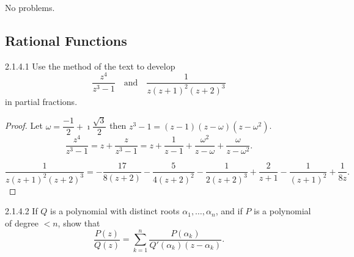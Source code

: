 No problems.

\subsection{Rational Functions}

\begin{problem}{2.1.4.1}
Use the method of the text to develop
\[
	\frac{z^{4}}{z^{3} - 1} \quad \text{and} \quad \frac{1}{z{(z+1)}^{2}{(z+2)}^{3}}
\]
in partial fractions.
\end{problem}

\begin{proof}
	Let \( \omega = \dfrac{-1}{2} + \imath\dfrac{\sqrt{3}}{2} \) then \( z^{3} - 1 = (z - 1)(z - \omega)(z - \omega^{2}) \).
	\[
		\frac{z^{4}}{z^{3} - 1} = z + \dfrac{z}{z^{3} - 1} = z + \dfrac{1}{z - 1} + \dfrac{\omega^{2}}{z - \omega} + \dfrac{\omega}{z - \omega^{2}}.
	\]

	\[
		\dfrac{1}{z{(z + 1)}^{2}{(z + 2)}^{3}} = - \frac{17}{8 (z + 2)} - \frac{5}{4 {\left(z + 2\right)}^{2}} - \frac{1}{2 {\left(z + 2\right)}^{3}} + \frac{2}{z + 1} - \frac{1}{{\left(z + 1\right)}^{2}} + \frac{1}{8 z}.
	\]
\end{proof}

\begin{problem}{2.1.4.2}
If \( Q \) is a polynomial with distinct roots \( \alpha_{1}, \ldots, \alpha_{n} \), and if \( P \) is a polynomial of degree \( < n \), show that
\[
	\frac{P(z)}{Q(z)} = \sum_{k=1}^{n} \frac{P(\alpha_{k})}{Q'(\alpha_{k})(z - \alpha_{k})}.
\]
\end{problem}

